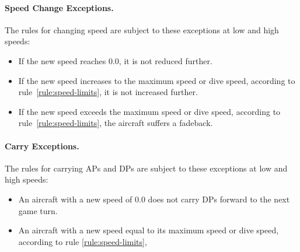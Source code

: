 {

\paragraph{Speed Change Exceptions.}

The rules for changing speed are subject to these exceptions at low and high speeds:

\begin{itemize}

\item If the new speed reaches 0.0, it is not reduced further.

\item If the new speed increases to the maximum speed or dive speed, according to rule~\ref{rule:speed-limits}, it is not increased further.

\item If the new speed exceeds the maximum speed or dive speed, according to rule~\ref{rule:speed-limits}, the aircraft suffers a fadeback.

\end{itemize}

\paragraph{Carry Exceptions.}

The rules for carrying APs and DPs are subject to these exceptions at low and high speeds:

\begin{itemize}
\item An aircraft with a new speed of 0.0 does not carry DPs forward to the next game turn.
\item An aircraft with a new speed equal to its maximum speed or dive speed, according to rule \ref{rule:speed-limits}, 
\end{itemize}

}


